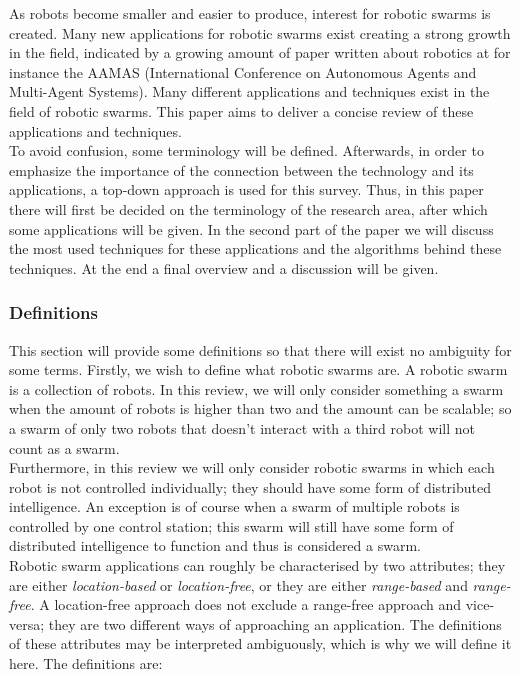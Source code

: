 As robots become smaller and easier to produce, interest for robotic swarms is created. Many new applications for robotic swarms exist creating a strong growth in the field, indicated by a growing amount of paper written about robotics at for instance the AAMAS (International Conference on Autonomous Agents and Multi-Agent Systems). \cite{Amigoni2014} Many different applications and techniques exist in the field of robotic swarms. This paper aims to deliver a concise review of these applications and techniques. \\

To avoid confusion, some terminology will be defined. Afterwards, in order to emphasize the importance of the connection between the technology and its applications, a top-down approach is used for this survey. Thus, in this paper there will first be decided on the terminology of the research area, after which some applications will be given. In the second part of the paper we will discuss the most used techniques for these applications and the algorithms behind these techniques. At the end a final overview and a discussion will be given.

\subsubsection{Definitions}
This section will provide some definitions so that there will exist no ambiguity for some terms. Firstly, we wish to define what robotic swarms are. A robotic swarm is a collection of robots. In this review, we will only consider something a swarm when the amount of robots is higher than two and the amount can be scalable; so a swarm of only two robots that doesn't interact with a third robot will not count as a swarm.  \\
Furthermore, in this review we will only consider robotic swarms in which each robot is not controlled individually; they should have some form of distributed intelligence. An exception is of course when a swarm of multiple robots is controlled by one control station; this swarm will still have some form of distributed intelligence to function and thus is considered a swarm.  \\

Robotic swarm applications can roughly be characterised by two attributes; they are either \emph{location-based} or \emph{location-free}, or they are either \emph{range-based} and  \emph{range-free}. A location-free approach does not exclude a range-free approach and vice-versa; they are two different ways of approaching an application. The definitions of these attributes may be interpreted ambiguously, which is why we will define it here. The definitions are:

